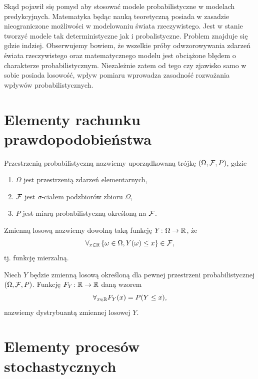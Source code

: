 \documentclass[10pt,a4paper]{book}
\begin{document}
Skąd pojawił się pomysł aby stosować modele probabilistyczne w modelach predykcyjnych. Matematyka będąc nauką teoretyczną posiada w zasadzie nieograniczone możliwości w modelowaniu świata rzeczywistego. Jest w stanie tworzyć modele tak deterministyczne jak i probalistyczne. Problem znajduje się gdzie indziej. Obserwujemy bowiem, że wszelkie próby odwzorowywania zdarzeń świata rzeczywistego oraz matematycznego modelu jest obciążone błędem o charakterze probabilistycznym. Niezależnie zatem od tego czy zjawisko samo w sobie posiada losowość, wpływ pomiaru wprowadza zasadność rozważania wpływów probabilistycznych.

\section{Elementy rachunku prawdopodobieństwa} 
 
\begin{definition}
Przestrzenią probabilistyczną nazwiemy uporządkowaną trójkę $ {\left( {\Omega, \mathcal{F}, P} \right)} $, gdzie
\begin{enumerate}
\item $\Omega$  jest przestrzenią zdarzeń elementarnych,
\item $\mathcal{F}$ jest $\sigma$-ciałem podzbiorów zbioru $\Omega$,
\item $P$ jest miarą probabilistyczną określoną na $\mathcal{F}$.
\end{enumerate}
\end{definition}

\begin{definition}
Zmienną losową nazwiemy dowolną taką funkcję $Y \colon \Omega \to \mathbb{R}$, że
$$
\forall_{x \in \mathbb{R} } \left\lbrace { \omega \in \Omega, Y(\omega) \leq x} \right\rbrace \in \mathcal{F},
$$
tj. funkcję mierzalną.
\end{definition}

\begin{definition}[Dystrybuanta]
Niech $Y$ będzie zmienną losową określoną dla pewnej przestrzeni probabilistycznej ${\left( {\Omega,\mathcal{F},P} \right)}$. Funkcję $F_Y \colon \mathbb{R} \to \mathbb{R}$ daną wzorem
$$
\forall_{x \in \mathbb{R} } F_Y(x) = P(Y \leq x),
$$
nazwiemy dystrybuantą zmiennej losowej $Y$.
\end{definition}

\section{Elementy procesów stochastycznych}
\end{document}
